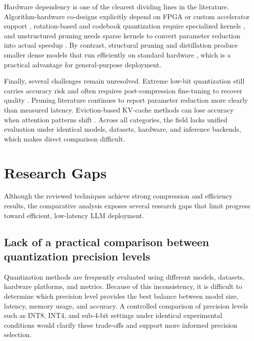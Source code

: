 \documentclass[
11pt, %
english, %
singlespacing, %
headsepline, %
]{MastersDoctoralThesis} %
\begin{document}
Hardware dependency is one of the clearest dividing lines in the literature. Algorithm-hardware co-designs explicitly depend on FPGA or custom accelerator support \cite{xu2026daypq,cho2025sub4bit,wang2025ofqllm}, rotation-based and codebook quantization require specialized kernels \cite{ashkboos2024quarot,tseng2024qtip}, and unstructured pruning needs sparse kernels to convert parameter reduction into actual speedup \cite{frantar2023sparsegpt,sun2024wanda}. By contrast, structural pruning and distillation produce smaller dense models that run efficiently on standard hardware \cite{ashkboos2024slicegpt,sanh2020distilbert,men2024shortgpt}, which is a practical advantage for general-purpose deployment.

Finally, several challenges remain unresolved. Extreme low-bit quantization still carries accuracy risk and often requires post-compression fine-tuning to recover quality \cite{chen2025efficientqat,malinovskii2024pvtuning}. Pruning literature continues to report parameter reduction more clearly than measured latency. Eviction-based KV-cache methods can lose accuracy when attention patterns shift \cite{zhang2023h2o,li2024snapkv}. Across all categories, the field lacks unified evaluation under identical models, datasets, hardware, and inference backends, which makes direct comparison difficult.

\section{Research Gaps}
\label{sec:lr-gaps}

Although the reviewed techniques achieve strong compression and efficiency results, the comparative analysis exposes several research gaps that limit progress toward efficient, low-latency LLM deployment.

\subsection{Lack of a practical comparison between quantization precision levels}

Quantization methods are frequently evaluated using different models, datasets, hardware platforms, and metrics. Because of this inconsistency, it is difficult to determine which precision level provides the best balance between model size, latency, memory usage, and accuracy. A controlled comparison of precision levels such as INT8, INT4, and sub-4-bit settings \cite{dettmers2022llmint8,frantar2023gptq,huang2024billm} under identical experimental conditions would clarify these trade-offs and support more informed precision selection.
\end{document}
